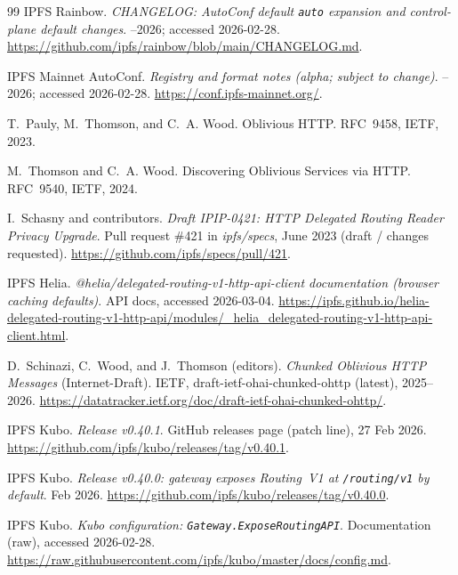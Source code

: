 \documentclass[11pt]{article}
\begin{document}
\begin{thebibliography}{99}
IPFS Rainbow.
\newblock \emph{CHANGELOG: AutoConf default \texttt{auto} expansion and control-plane default changes}.
--2026; accessed 2026-02-28.
\newblock \url{https://github.com/ipfs/rainbow/blob/main/CHANGELOG.md}.


IPFS Mainnet AutoConf.
\newblock \emph{Registry and format notes (alpha; subject to change)}.
--2026; accessed 2026-02-28.
\newblock \url{https://conf.ipfs-mainnet.org/}.


T.~Pauly, M.~Thomson, and C.~A. Wood.
\newblock Oblivious HTTP.
\newblock RFC~9458, IETF, 2023.

M.~Thomson and C.~A. Wood.
\newblock Discovering Oblivious Services via HTTP.
\newblock RFC~9540, IETF, 2024.

I.~Schasny and contributors.
\newblock \emph{Draft IPIP-0421: HTTP Delegated Routing Reader Privacy Upgrade}.
\newblock Pull request \#421 in \emph{ipfs/specs}, June 2023 (draft / changes requested).
\newblock \url{https://github.com/ipfs/specs/pull/421}.


IPFS Helia.
\newblock \emph{@helia/delegated-routing-v1-http-api-client documentation (browser caching defaults)}.
\newblock API docs, accessed 2026-03-04.
\newblock \url{https://ipfs.github.io/helia-delegated-routing-v1-http-api/modules/_helia_delegated-routing-v1-http-api-client.html}.

D.~Schinazi, C.~Wood, and J.~Thomson (editors).
\newblock \emph{Chunked Oblivious HTTP Messages} (Internet-Draft).
\newblock IETF, draft-ietf-ohai-chunked-ohttp (latest), 2025--2026.
\newblock \url{https://datatracker.ietf.org/doc/draft-ietf-ohai-chunked-ohttp/}.

IPFS Kubo.
\newblock \emph{Release v0.40.1}.
\newblock GitHub releases page (patch line), 27 Feb 2026.
\newblock \url{https://github.com/ipfs/kubo/releases/tag/v0.40.1}.

IPFS Kubo.
\newblock \emph{Release v0.40.0: gateway exposes Routing~V1 at \texttt{/routing/v1} by default}.
 Feb 2026.
\newblock \url{https://github.com/ipfs/kubo/releases/tag/v0.40.0}.

IPFS Kubo.
\newblock \emph{Kubo configuration: \texttt{Gateway.ExposeRoutingAPI}}.
\newblock Documentation (raw), accessed 2026-02-28.
\newblock \url{https://raw.githubusercontent.com/ipfs/kubo/master/docs/config.md}.


\end{thebibliography}
\end{document}
